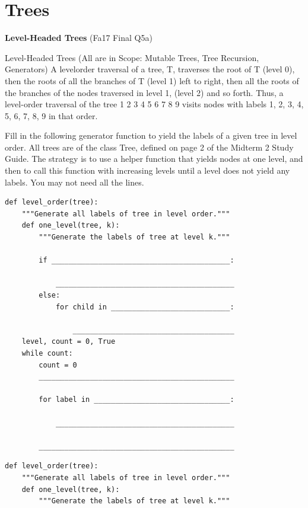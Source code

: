 \documentclass{exam}
\newlength{\currentparskip}
\newenvironment{blocksection}
{
    \setlength{\currentparskip}{\parskip}%
    \begin{minipage}{\linewidth}
    \setlength{\parskip}{\currentparskip}%
}
{
    \end{minipage}
}
\begin{document}
\section{Trees}
\begin{questions}

\begin{blocksection}
\question \textbf{Level-Headed Trees} (Fa17 Final Q5a)

Level-Headed Trees (All are in Scope: Mutable Trees, Tree Recursion, Generators) A levelorder traversal of a tree, T, traverses the root of T (level 0), then the roots of all the branches of T (level 1)
left to right, then all the roots of the branches of the nodes traversed in level 1, (level 2) and so forth. Thus, a
level-order traversal of the tree
                        1
                    2   3   4
                5     6    7    8    9
visits nodes with labels 1, 2, 3, 4, 5, 6, 7, 8, 9 in that order.

Fill in the following generator function to yield the labels of a given tree in level order. All trees are
of the class Tree, defined on page 2 of the Midterm 2 Study Guide. The strategy is to use a helper function
that yields nodes at one level, and then to call this function with increasing levels until a level does not yield
any labels. You may not need all the lines.
\begin{lstlisting}
def level_order(tree):
    """Generate all labels of tree in level order."""
    def one_level(tree, k):
        """Generate the labels of tree at level k."""
        
        if __________________________________________:

            __________________________________________
        else:
            for child in ____________________________:

                ______________________________________
    level, count = 0, True
    while count:
        count = 0
        ______________________________________________

        for label in ________________________________:

            __________________________________________

        ______________________________________________
\end{lstlisting}
\end{blocksection}
\begin{solution}
\begin{lstlisting}
def level_order(tree):
    """Generate all labels of tree in level order."""
    def one_level(tree, k):
        """Generate the labels of tree at level k."""
            

\end{lstlisting}
\end{solution}
\end{questions}
\end{document}
